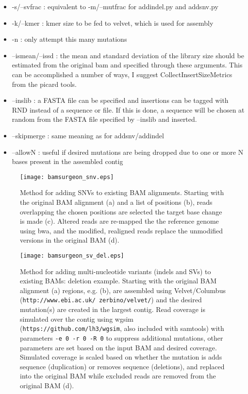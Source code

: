\documentclass[letterpaper,11pt]{article}
\begin{document}
\begin{itemize}
\item -s/--svfrac : equivalent to -m/--mutfrac for addindel.py and addsnv.py
\item -k/--kmer : kmer size to be fed to velvet, which is used for assembly
\item -n : only attempt this many mutations
\item --ismean/--issd : the mean and standard deviation of the library size should be estimated from the original bam and specified through these arguments. This can be accomplished a number of ways, I suggest CollectInsertSizeMetrics from the picard tools.
\item --inslib : a FASTA file can be specified and insertions can be tagged with RND instead of a sequence or file. If this is done, a sequence will be chosen at random from the FASTA file specified by --inslib and inserted.
\item --skipmerge : same meaning as for addsnv/addindel
\item --allowN : useful if desired mutations are being dropped due to one or more N bases present in the assembled contig
\end{itemize}

\newpage %
\begin{figure}[!h]
\centering
\texttt{[image: bamsurgeon\_snv.eps]}
\caption{Method for adding SNVs to existing BAM alignments. Starting with the original BAM alignment (a) and a list of positions (b), reads overlapping the chosen positions are selected the target base change is made (c). Altered reads are re-mapped the the reference genome using bwa, and the modified, realigned reads replace the unmodified versions in the original BAM (d).}
\end{figure}

\newpage %

\begin{figure}[!h]
\centering
\texttt{[image: bamsurgeon\_sv\_del.eps]}
\caption{Method for adding multi-nucleotide variants (indels and SVs) to existing BAMs: deletion example. Starting with the original BAM alignment (a) regions, e.g. (b), are assembled using Velvet/Columbus (\texttt{http://www.ebi.ac.uk/~zerbino/velvet/}) and the desired mutation(s) are created in the largest contig. Read coverage is simulated over the contig using wgsim (\texttt{https://github.com/lh3/wgsim}, also included with samtools) with parameters \texttt{-e 0 -r 0 -R 0} to suppress additional mutations, other parameters are set based on the input BAM and desired coverage. Simulated coverage is scaled based on whether the mutation is adds sequence (duplication) or removes sequence (deletions), and replaced into the original BAM while excluded reads are removed from the original BAM (d).}
\end{figure}
\end{document}
